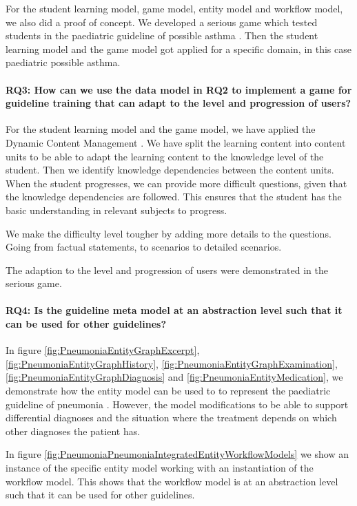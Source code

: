 For the student learning model, game model, entity model and workflow model, we also did a proof of concept. We developed a serious game which tested students in the paediatric guideline of possible asthma \parencite{RepublicofKeny2016}. Then the student learning model and the game model got applied for a specific domain, in this case paediatric possible asthma.

\paragraph{RQ3: How can we use the data model in RQ2 to implement a game for guideline training that can adapt to the level and progression of users?}

For the student learning model and the game model, we have applied the Dynamic Content Management \parencite{Eide2008}. We have split the learning content into content units to be able to adapt the learning content to the knowledge level of the student. Then we identify knowledge dependencies between the content units. When the student progresses, we can provide more difficult questions, given that the knowledge dependencies are followed. This ensures that the student has the basic understanding in relevant subjects to progress.

We make the difficulty level tougher by adding more details to the questions. Going from factual statements, to scenarios to detailed scenarios.

The adaption to the level and progression of users were demonstrated in the serious game.

\paragraph{RQ4: Is the guideline meta model at an abstraction level such that it can be used for other guidelines?}

In figure \ref{fig:PneumoniaEntityGraphExcerpt}, \ref{fig:PneumoniaEntityGraphHistory}, \ref{fig:PneumoniaEntityGraphExamination}, \ref{fig:PneumoniaEntityGraphDiagnosis} and \ref{fig:PneumoniaEntityMedication}, we demonstrate how the entity model can be used to to represent the paediatric guideline of pneumonia \parencite{RepublicofKeny2016}. However, the model modifications to be able to support differential diagnoses and the situation where the treatment depends on which other diagnoses the patient has.

In figure \ref{fig:PneumoniaPneumoniaIntegratedEntityWorkflowModels} we show an instance of the specific entity model working with an instantiation of the workflow model. This shows that the workflow model is at an abstraction level such that it can be used for other guidelines.

